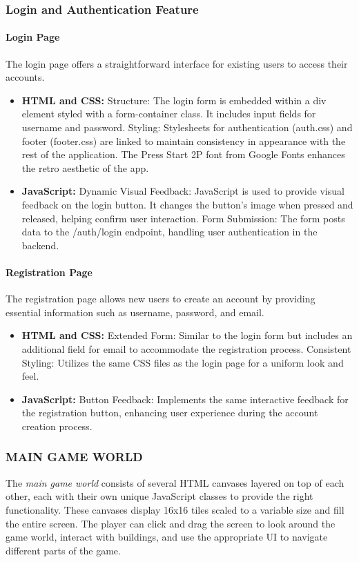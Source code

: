 \documentclass[12pt]{article}
\begin{document}
\subsubsection{Login and Authentication Feature}
\paragraph{Login Page}
The login page offers a straightforward interface for existing users to access their accounts.
\begin{itemize}
    \item \textbf{HTML and CSS:} Structure: The login form is embedded within a div element styled with a form-container class. It includes input fields for username and password. Styling: Stylesheets for authentication (auth.css) and footer (footer.css) are linked to maintain consistency in appearance with the rest of the application. The Press Start 2P font from Google Fonts enhances the retro aesthetic of the app.
    \item \textbf{JavaScript:} Dynamic Visual Feedback: JavaScript is used to provide visual feedback on the login button. It changes the button's image when pressed and released, helping confirm user interaction. Form Submission: The form posts data to the /auth/login endpoint, handling user authentication in the backend.
\end{itemize}
\paragraph{Registration Page}
The registration page allows new users to create an account by providing essential information such as username, password, and email.
\begin{itemize}
    \item \textbf{HTML and CSS:} Extended Form: Similar to the login form but includes an additional field for email to accommodate the registration process. Consistent Styling: Utilizes the same CSS files as the login page for a uniform look and feel.
    \item \textbf{JavaScript:} Button Feedback: Implements the same interactive feedback for the registration button, enhancing user experience during the account creation process.
\end{itemize}

\subsubsection{MAIN GAME WORLD}
The \textit{main game world} consists of several HTML canvases layered on top of each other, each with their own unique
JavaScript classes to provide the right functionality. These canvases display 16x16 tiles scaled to a variable size and
fill the entire screen. The player can click and drag the screen to look around the game world, interact with buildings,
and use the appropriate UI to navigate different parts of the game.
\end{document}
